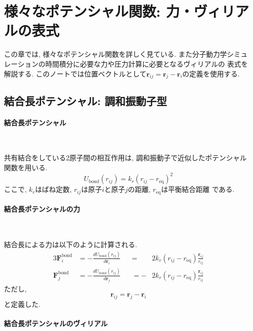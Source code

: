 \clearpage
\section{様々なポテンシャル関数: 力・ヴィリアルの表式}
この章では, 様々なポテンシャル関数を詳しく見ている.
また分子動力学シミュレーションの時間積分に必要な力や圧力計算に必要となるヴィリアルの
表式を解説する.
このノートでは位置ベクトルとして$\bm{r}_{ij} = \bm{r}_{j} - \bm{r}_{i}$の定義を使用する.

\subsection{結合長ポテンシャル: 調和振動子型}
\paragraph{結合長ポテンシャル}  \

共有結合をしている2原子間の相互作用は, 調和振動子で近似したポテンシャル関数を用いる. 
\begin{equation}
 U_{\mathrm{bond}}(r_{ij}) = k_{r} (r_{ij} - r_{\mathrm{eq}})^{2}
 \label{eq:BioModel2}
\end{equation}
ここで, $k_{r}$はばね定数, $r_{ij}$は原子$i$と原子$j$の距離, $r_{\mathrm{eq}}$は平衡結合距離
である.

\paragraph{結合長ポテンシャルの力} \

結合長による力は以下のように計算される. 
\begin{alignat}{3}
    \bm{F}_{i}^{\mathrm{bond}}
 &= 
     -\frac{d U_{\mathrm{bond}}(r_{ij})}{d \bm{r}_{i}}
 &&= &
     2 k_{r} (r_{ij} - r_{\mathrm{eq}}) \frac{\bm{r}_{ij}}{r_{ij}}
 \label{eq:BioModel3}
 \\
 \bm{F}_{j}^{\mathrm{bond}}
 &=
   -\frac{d U_{\mathrm{bond}}(r_{ij})}{d \bm{r}_{j}}
 &&= -&
     2 k_{r} (r_{ij} - r_{\mathrm{eq}}) \frac{\bm{r}_{ij}}{r_{ij}}
 \label{eq:BioModel4}
\end{alignat}
ただし, 
\begin{equation}
 \bm{r}_{ij} = \bm{r}_{j} - \bm{r}_{i}
 \label{eq:BioModel4.5}
\end{equation}
と定義した.

\paragraph{結合長ポテンシャルのヴィリアル} \

